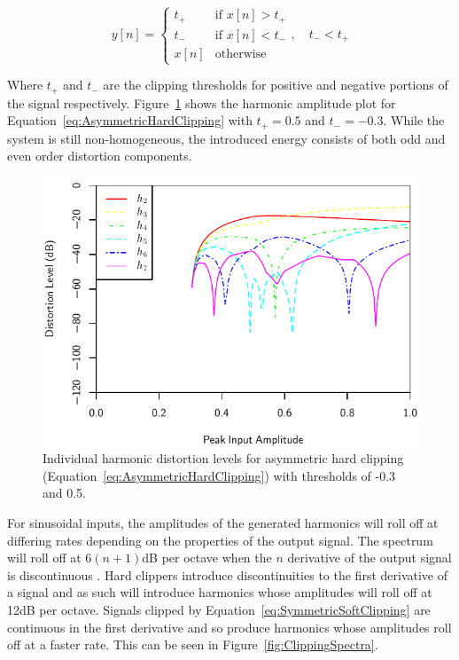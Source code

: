 			\begin{equation}
				y[n] = \begin{cases}
					t_{+} & \text{if $x[n] > t_{+}$} \\
					t_{-} & \text{if $x[n] < t_{-}$} \\
					x[n] & \text{otherwise}
				\end{cases}, \quad t_{-} < t_{+}
				\label{eq:AsymmetricHardClipping}
			\end{equation}

			Where $t_{+}$ and $t_{-}$ are the clipping thresholds for positive and negative portions of the
			signal respectively. Figure~\ref{fig:AsymmetricHardClippingHarmonics} shows the harmonic amplitude
			plot for Equation~\ref{eq:AsymmetricHardClipping} with $t_{+} = 0.5$ and $t_{-} = -0.3$. While the
			system is still non-homogeneous, the introduced energy consists of both odd and even order
			distortion components.

			\begin{figure}[h!]
				\centering
				\includegraphics{chapter5/Images/AsymmetricHardClippingHarmonics.pdf}
				\caption{Individual harmonic distortion levels for asymmetric hard clipping
					 (Equation~\ref{eq:AsymmetricHardClipping}) with thresholds of -0.3 and 0.5.}
				\label{fig:AsymmetricHardClippingHarmonics}
			\end{figure}

			For sinusoidal inputs, the amplitudes of the generated harmonics will roll off at differing rates
			depending on the properties of the output signal. The spectrum will roll off at $6(n+1)$dB per
			octave when the $n$ derivative of the output signal is discontinuous
			\citep{kraght2000aliasing}.  Hard clippers introduce discontinuities to the first derivative of a
			signal and as such will introduce harmonics whose amplitudes will roll off at 12dB per octave.
			Signals clipped by Equation~\ref{eq:SymmetricSoftClipping} are continuous in the first derivative
			and so produce harmonics whose amplitudes roll off at a faster rate. This can be seen in
			Figure~\ref{fig:ClippingSpectra}.

